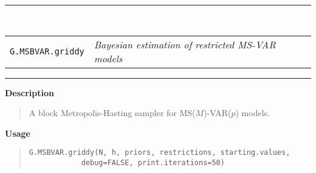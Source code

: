 \documentclass[final,3p,authoryear]{elsarticle}
\begin{document}
\small
\bigskip
\begin{center}
\rule{15cm}{.1pt}\\

\bigskip\begin{tabular}{p{3.5cm} l}
\texttt{G.MSBVAR.griddy} & \textit{Bayesian estimation of restricted MS-VAR models} 
\end{tabular}

\smallskip
\rule{15cm}{.1pt}
\end{center}

\bigskip\noindent\textbf{Description}
\begin{quote}
A block Metropolis-Hasting sampler for MS($M$)-VAR($p$) models.
\end{quote}


\bigskip\noindent\textbf{Usage}
\begin{quote}
\begin{verbatim}
G.MSBVAR.griddy(N, h, priors, restrictions, starting.values, 
            debug=FALSE, print.iterations=50)
\end{verbatim}
\end{quote}
\end{document}
